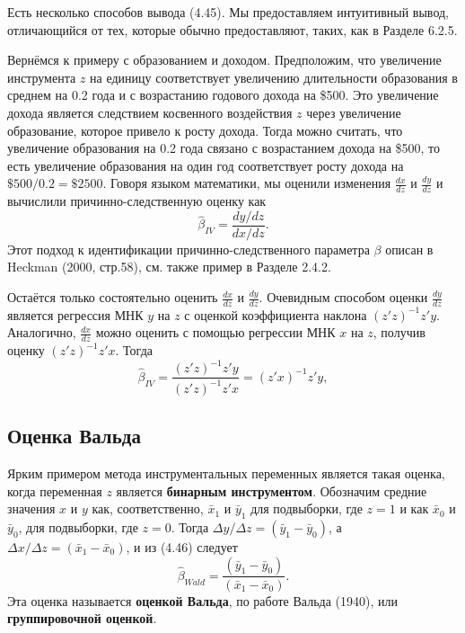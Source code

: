 Есть несколько способов вывода (4.45). Мы предоставляем интуитивный вывод, отличающийся от тех, которые обычно предоставляют, таких, как в Разделе 6.2.5.

Вернёмся к примеру с образованием и доходом. Предположим, что увеличение инструмента $z$ на единицу соответствует  увеличению длительности образования в среднем на 0.2 года и с возрастанию годового дохода на \$500. Это увеличение дохода является следствием косвенного воздействия $z$ через увеличение образование, которое привело к росту дохода. Тогда можно считать, что увеличение образования на 0.2 года связано с возрастанием дохода на \$500, то есть увеличение образования на один год соответствует росту дохода на $\$500/0.2 = \$2500$. Говоря языком математики, мы оценили изменения $\frac{dx}{dz}$ и $\frac{dy}{dz}$ и вычислили причинно-следственную оценку как
\begin{equation}
\hat{\beta}_{IV} = \frac{dy/dz}{dx/dz}.
\end{equation}
Этот подход к идентификации причинно-следственного параметра $\beta$ описан в Heckman (2000, стр.58), см. также пример в Разделе 2.4.2.

Остаётся только состоятельно оценить $\frac{dx}{dz}$ и $\frac{dy}{dz}$. Очевидным способом оценки $\frac{dy}{dz}$ является регрессия МНК $y$ на $z$ с оценкой коэффициента наклона $(z'z)^{-1}z'y$. Аналогично, $\frac{dx}{dz}$ можно оценить с помощью регрессии МНК $x$ на $z$, получив оценку $(z'z)^{-1}z'x$. Тогда
\begin{equation}
\hat{\beta}_{IV} =\frac{(z'z)^{-1}z'y}{(z'z)^{-1}z'x} = (z'x)^{-1}z'y,
\end{equation}

\subsection{Оценка Вальда}
Ярким примером метода инструментальных переменных является такая оценка, когда переменная $z$ является \textbf{бинарным инструментом}. Обозначим средние значения $x$ и $y$ как, соответственно, $\bar{x}_1$ и $\bar{y}_1$ для подвыборки, где $z=1$ и как $\bar{x}_0$ и $\bar{y}_0$, для подвыборки, где $z=0$. Тогда $\Delta y /\Delta z = (\bar{y}_1-\bar{y}_0)$, а $\Delta x /\Delta z = (\bar{x}_1-\bar{x}_0)$, и из (4.46) следует 
\begin{equation}
\hat{\beta}_{Wald} = \frac{(\bar{y}_1-\bar{y}_0)}{(\bar{x}_1-\bar{x}_0)}.
\end{equation}
Эта оценка называется \textbf{оценкой Вальда}, по работе Вальда (1940), или \textbf{группировочной оценкой}.

